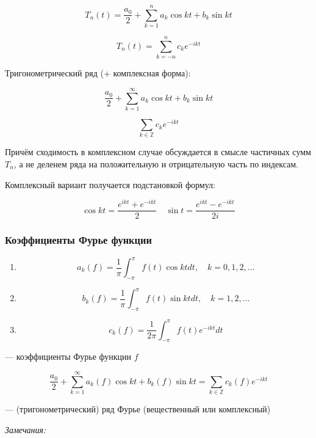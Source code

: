 \documentclass{article}
\begin{document}
\[T_n(t) = \frac{a_0}{2} + \sum_{k = 1}^{n} a_k\cos kt + b_k \sin kt\]

\[T_n(t) = \sum_{k = -n}^{n} c_k e^{-ikt}\]

Тригонометрический ряд (+ комплексная форма):

\[\frac{a_0}{2} + \sum_{k = 1}^{\infty} a_k\cos kt + b_k \sin kt\]

\[\sum_{k \in \mathbb{Z}} c_k e^{-ikt}\]

Причём сходимость в комплексном случае обсуждается в смысле частичных сумм $T_n$, а не деленем ряда на положительную и отрицательную часть по индексам.

Комплексный вариант получается подстановкой формул:

\[\cos kt = \frac{e^{ikt} + e^{-ikt}}{2} \quad \sin t = \frac{e^{ikt} - e^{-ikt}}{2i}\]

\subsubsection{Коэффициенты Фурье функции}

\begin{enumerate}
    \item \[a_k(f) = \frac{1}{\pi} \int_{-\pi}^{\pi} f(t) \cos kt dt, \quad k = 0, 1, 2, \ldots\]
    \item \[b_k(f) = \frac{1}{\pi} \int_{-\pi}^{\pi} f(t) \sin kt dt, \quad k = 1, 2, \ldots\]
    \item \[c_k(f) = \frac{1}{2\pi} \int_{-\pi}^{\pi} f(t) e^{-ikt} dt\]
\end{enumerate}

--- коэффициенты Фурье функции $f$

\[\frac{a_0}{2} + \sum_{k = 1}^{\infty} a_k(f) \cos kt + b_k(f) \sin kt = \sum_{k \in \mathbb{Z}} c_k(f) e^{-ikt}\]

--- (тригонометрический) ряд Фурье (вещественный или комплексный)

\textit{Замечания:}
\end{document}
